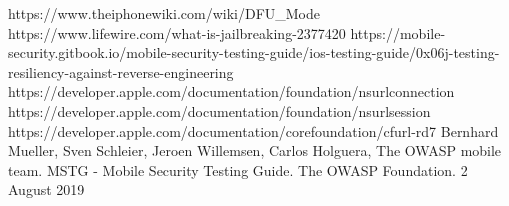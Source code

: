 \documentclass[runningheads]{llncs}
\begin{document}


\newpage
\hfill

%




%
%
%
% 
% 
%

\begin{thebibliography}{8}

 https://www.theiphonewiki.com/wiki/DFU\_Mode
 https://www.lifewire.com/what-is-jailbreaking-2377420
 https://mobile-security.gitbook.io/mobile-security-testing-guide/ios-testing-guide/0x06j-testing-resiliency-against-reverse-engineering
 https://developer.apple.com/documentation/foundation/nsurlconnection
 https://developer.apple.com/documentation/foundation/nsurlsession
 https://developer.apple.com/documentation/corefoundation/cfurl-rd7
 Bernhard Mueller, Sven Schleier, Jeroen Willemsen, Carlos Holguera, The OWASP mobile team. MSTG - Mobile Security Testing Guide. The OWASP Foundation. 2 August 2019
\end{thebibliography}
\end{document}
